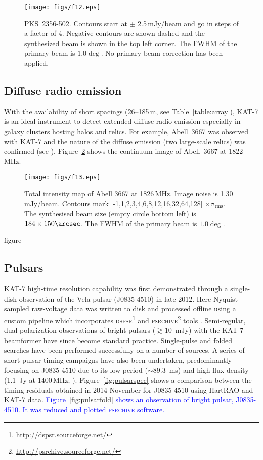 \begin{figure}
\texttt{[image: figs/f12.eps]}
\caption{\mbox{PKS 2356-502}. Contours start at $\pm$ 2.5\,mJy/beam and go in
  steps of a factor of 4. Negative contours are shown dashed and the
  synthesized beam is shown in the top left corner. 
  The FWHM of the primary beam is $1.0\deg$. No primary beam
  correction has been applied. 
}
\label{fig:2326}
\end{figure}




\subsection{Diffuse radio emission}

\noindent
With the availability of short spacings (26--185\,m, see
Table~\ref{table:array}), KAT-7 is an ideal instrument to detect
extended diffuse radio emission especially in galaxy clusters hosting
halos and relics. For example, Abell~3667 was observed with KAT-7 and
the nature of the diffuse emission (two large-scale relics) was confirmed
(see \citealt{riseley}). 
Figure~\ref{fig:aco} shows the continuum image of
Abell~3667 at 1822\,MHz.




\begin{figure}
\texttt{[image: figs/f13.eps]}
\caption{Total intensity map of Abell 3667 at 1826\,MHz. Image noise
  is 1.30\,mJy/beam. Contours mark [-1,1,2,3,4,6,8,12,16,32,64,128]
  $\mathrm{\times \sigma_{rms}}$. The synthesised beam size (empty circle bottom left) is
  $\mathrm{184 \times 150 \arcsec}$.
  The FWHM of the primary beam is $\mathrm{1.0\deg}$.
  }
\label{fig:aco}
\end{figure}


figure \subsection{Pulsars}

\noindent


KAT-7 high-time resolution capability was first demonstrated through a
single-dish observation of the Vela pulsar (\mbox{J0835-4510}) in late
2012. Here Nyquist-sampled raw-voltage data was written to disk and
processed offline using a custom pipeline which incorporates
{\small\textsc{dspsr}}\footnote{\url{http://dspsr.sourceforge.net/}}
and
{\small\textsc{psrchive}}\footnote{\url{http://psrchive.sourceforge.net/}}
tools \citep{hotan}. Semi-regular, dual-polarization observations of
bright pulsars ($\gtrsim 10$~mJy) with the KAT-7 beamformer have since
become standard practice. Single-pulse and folded searches have been
performed successfully on a number of sources. A series of short
pulsar timing campaigns have also been undertaken, predominantly
focusing on \mbox{J0835-4510} due to its low period ($\sim$89.3~ms)
and high flux density (1.1~Jy at 1400\,MHz;
\citealt{bf74}). Figure~\ref{fig:pulsarspec} shows a comparison
between the timing residuals obtained in 2014 November for
\mbox{J0835-4510} using HartRAO and KAT-7 data.  \textcolor{blue}{
  Figure~\ref{fig:pulsarfold} shows an observation of bright pulsar,
  \mbox{J0835-4510}. It was reduced and plotted \textsc{psrchive}
  software.}

